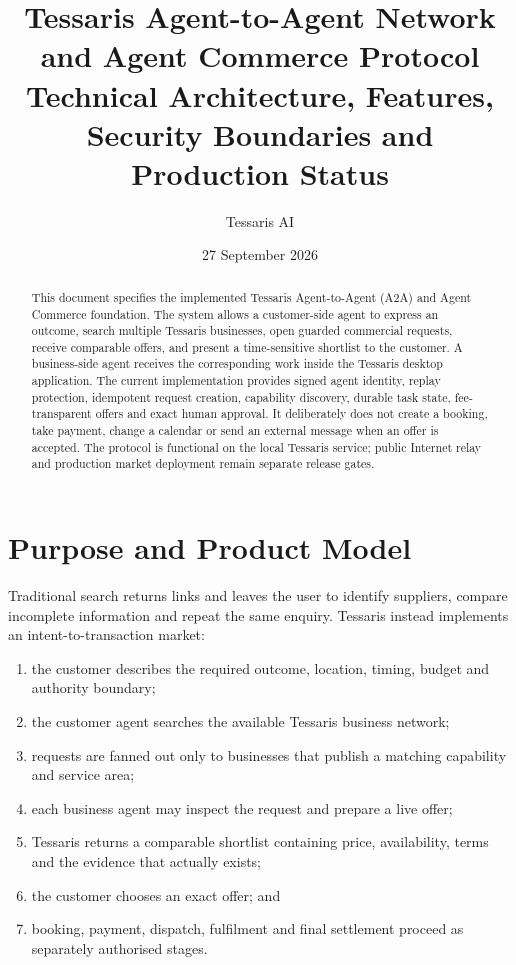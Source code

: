 \documentclass[11pt,a4paper]{article}
\title{\textbf{Tessaris Agent-to-Agent Network and Agent Commerce Protocol}\\[4pt]
\large Technical Architecture, Features, Security Boundaries and Production Status}
\author{Tessaris AI}
\date{27 September 2026}
\begin{document}
\maketitle

\begin{abstract}
This document specifies the implemented Tessaris Agent-to-Agent (A2A) and
Agent Commerce foundation.  The system allows a customer-side agent to express
an outcome, search multiple Tessaris businesses, open guarded commercial
requests, receive comparable offers, and present a time-sensitive shortlist to
the customer.  A business-side agent receives the corresponding work inside
the Tessaris desktop application.  The current implementation provides signed
agent identity, replay protection, idempotent request creation, capability
discovery, durable task state, fee-transparent offers and exact human approval.
It deliberately does not create a booking, take payment, change a calendar or
send an external message when an offer is accepted.  The protocol is functional
on the local Tessaris service; public Internet relay and production market
deployment remain separate release gates.
\end{abstract}

\tableofcontents
\newpage

\section{Purpose and Product Model}

Traditional search returns links and leaves the user to identify suppliers,
compare incomplete information and repeat the same enquiry.  Tessaris instead
implements an intent-to-transaction market:

\begin{enumerate}
  \item the customer describes the required outcome, location, timing, budget
        and authority boundary;
  \item the customer agent searches the available Tessaris business network;
  \item requests are fanned out only to businesses that publish a matching
        capability and service area;
  \item each business agent may inspect the request and prepare a live offer;
  \item Tessaris returns a comparable shortlist containing price, availability,
        terms and the evidence that actually exists;
  \item the customer chooses an exact offer; and
  \item booking, payment, dispatch, fulfilment and final settlement proceed as
        separately authorised stages.
\end{enumerate}
\end{document}
